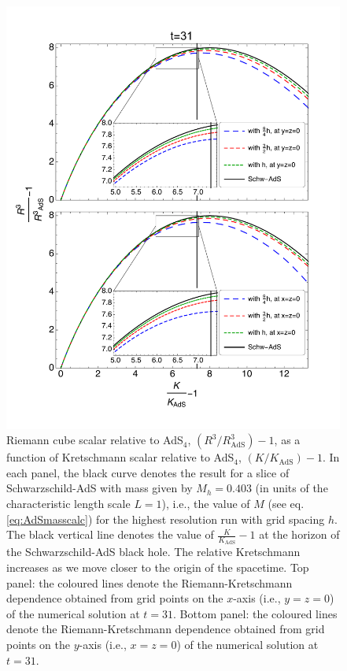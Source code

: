 \documentclass[aps,letterpaper,twocolumn,nofootinbib]{revtex4}
\numberwithin{equation}{section}
\begin{document}
\begin{figure}[t!]
        \centering
        \includegraphics[width=5.02in,clip=true]{combined_withzoom_fullplotrelRieCubeofrelkretschallres.pdf}
\parbox{5.0in}{\caption{
Riemann cube scalar relative to AdS$_4$, $(R^3/R^3_{\text{AdS}})-1$, as a function of Kretschmann scalar relative to AdS$_4$, $(K/K_{\text{AdS}})-1$.
In each panel, the black curve denotes the result for a slice of Schwarzschild-AdS with mass given by $M_h=0.403$ (in units of the characteristic length scale $L=1$), i.e., the value of $M$ (see eq. \eqref{eq:AdSmasscalc}) for the highest resolution run with grid spacing $h$. The black vertical line denotes the value of $\frac{K}{K_{\text{AdS}}}-1$ at the horizon of the Schwarzschild-AdS black hole. The relative Kretschmann increases as we move closer to the origin of the spacetime.
Top panel: the coloured lines denote the Riemann-Kretschmann dependence obtained from grid points on the $x$-axis (i.e., $y=z=0$) of the numerical solution at $t=31$. 
Bottom panel: the coloured lines denote the Riemann-Kretschmann dependence obtained from grid points on the $y$-axis (i.e., $x=z=0$) of the numerical solution at $t=31$.
        }\label{fig:relRiemanncube-relKretschmann-comparison-SchwAdS}}
\end{figure}
\end{document}
